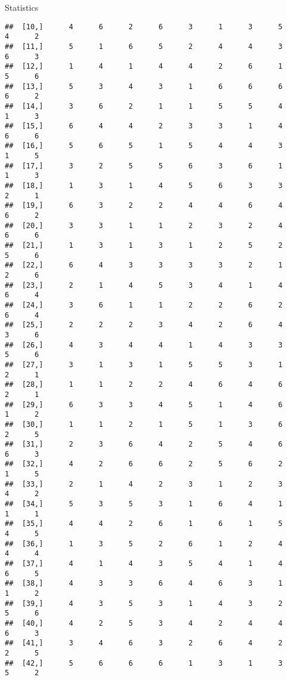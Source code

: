 \documentclass[
  ignorenonframetext,
]{beamer}
\begin{document}
\begin{frame}[fragile]{Statistics}
\begin{verbatim}
##  [10,]      4      6      2      6      3      1      3      5      4      2
##  [11,]      5      1      6      5      2      4      4      3      6      3
##  [12,]      1      4      1      4      4      2      6      1      5      6
##  [13,]      5      3      4      3      1      6      6      6      6      2
##  [14,]      3      6      2      1      1      5      5      4      1      3
##  [15,]      6      4      4      2      3      3      1      4      6      6
##  [16,]      5      6      5      1      5      4      4      3      1      5
##  [17,]      3      2      5      5      6      3      6      1      1      3
##  [18,]      1      3      1      4      5      6      3      3      2      1
##  [19,]      6      3      2      2      4      4      6      4      6      2
##  [20,]      3      3      1      1      2      3      2      4      6      6
##  [21,]      1      3      1      3      1      2      5      2      5      6
##  [22,]      6      4      3      3      3      3      2      1      2      6
##  [23,]      2      1      4      5      3      4      1      4      6      4
##  [24,]      3      6      1      1      2      2      6      2      6      4
##  [25,]      2      2      2      3      4      2      6      4      3      6
##  [26,]      4      3      4      4      1      4      3      3      5      6
##  [27,]      3      1      3      1      5      5      3      1      2      1
##  [28,]      1      1      2      2      4      6      4      6      2      1
##  [29,]      6      3      3      4      5      1      4      6      1      2
##  [30,]      1      1      2      1      5      1      3      6      2      5
##  [31,]      2      3      6      4      2      5      4      6      6      3
##  [32,]      4      2      6      6      2      5      6      2      1      5
##  [33,]      2      1      4      2      3      1      2      3      4      2
##  [34,]      5      3      5      3      1      6      4      1      1      1
##  [35,]      4      4      2      6      1      6      1      5      4      5
##  [36,]      1      3      5      2      6      1      2      4      4      4
##  [37,]      4      1      4      3      5      4      1      4      6      5
##  [38,]      4      3      3      6      4      6      3      1      1      2
##  [39,]      4      3      5      3      1      4      3      2      5      6
##  [40,]      4      2      5      3      4      2      4      4      6      3
##  [41,]      3      4      6      3      2      6      4      2      2      5
##  [42,]      5      6      6      6      1      3      1      3      5      2

\end{verbatim}
\end{frame}
\end{document}
